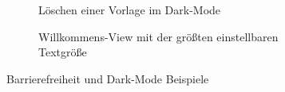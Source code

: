 \documentclass[notables, nomenclature, oneside, 150]{HSMW-Thesis}
\begin{document}
\begin{figure}[h]
\begin{subfigure}[t]{0.3\textwidth}
        	\caption{Löschen einer Vorlage im Dark-Mode}
        	\label{fig:z2}
    	\end{subfigure}
    	\begin{subfigure}[t]{0.3\textwidth}
        	\caption{Willkommens-View mit der größten einstellbaren Textgröße}
        	\label{fig:z3}
    	\end{subfigure}
    	\caption{Barrierefreiheit und Dark-Mode Beispiele}
		\label{fig:zusatz4}
	\end{figure}
	
\end{document}
